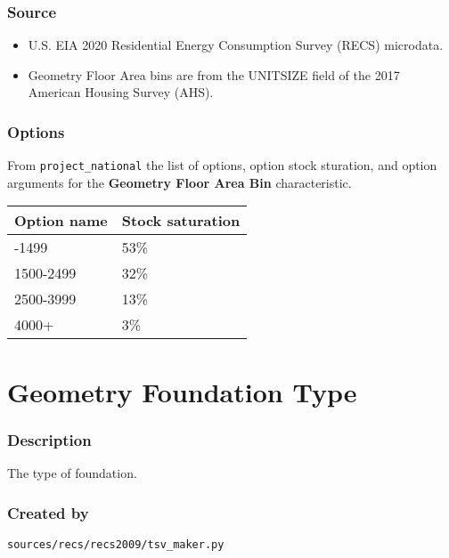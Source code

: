 \subsubsection{Source}\label{source-52}

\begin{itemize}
 
\item
  U.S. EIA 2020 Residential Energy Consumption Survey (RECS) microdata.
\item
  Geometry Floor Area bins are from the UNITSIZE field of the 2017
  American Housing Survey (AHS).
\end{itemize}

\subsubsection{Options}\label{options-53}

From \texttt{project\_national} the list of options, option stock
sturation, and option arguments for the \textbf{Geometry Floor Area Bin}
characteristic.

\begin{longtable}[]{@{}ll@{}}
\toprule\noalign{}
Option name & Stock saturation \\
\midrule\noalign{}
\endhead
\bottomrule\noalign{}
\endlastfoot
0-1499 & 53\% \\
1500-2499 & 32\% \\
2500-3999 & 13\% \\
4000+ & 3\% \\
\end{longtable}

\section{Geometry Foundation Type}\label{geometry_foundation_type}

\subsubsection{Description}\label{description-54}

The type of foundation.

\subsubsection{Created by}\label{created-by-54}

\texttt{sources/recs/recs2009/tsv\_maker.py}

